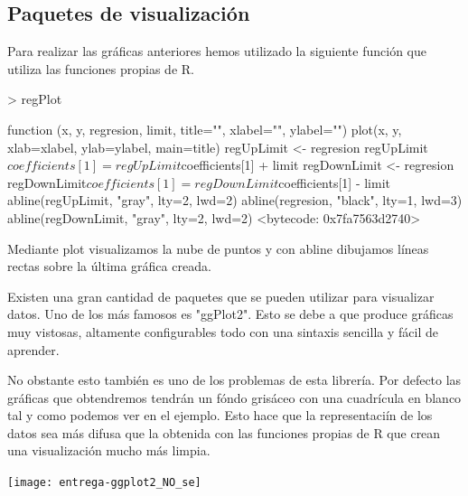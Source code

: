 \documentclass [a4paper] {article}
\begin{document}
\subsection{Paquetes de visualización}
Para realizar las gráficas anteriores hemos utilizado la siguiente función que utiliza las funciones propias de R.
\begin{Schunk}
\begin{Sinput}
> regPlot
\end{Sinput}
\begin{Soutput}
function (x, y, regresion, limit, title="", xlabel="", ylabel="") {
  plot(x, y, xlab=xlabel, ylab=ylabel, main=title)
  regUpLimit <- regresion
  regUpLimit$coefficients[1] = regUpLimit$coefficients[1] + limit
  regDownLimit <- regresion
  regDownLimit$coefficients[1] = regDownLimit$coefficients[1] - limit
  abline(regUpLimit, "gray", lty=2, lwd=2)
  abline(regresion, "black", lty=1, lwd=3)
  abline(regDownLimit, "gray", lty=2, lwd=2)
}
<bytecode: 0x7fa7563d2740>
\end{Soutput}
\end{Schunk}
Mediante plot visualizamos la nube de puntos y con abline dibujamos líneas rectas sobre la última gráfica creada.

Existen una gran cantidad de paquetes que se pueden utilizar para visualizar datos.
Uno de los más famosos es "ggPlot2".
Esto se debe a que produce gráficas muy vistosas, altamente configurables todo con una sintaxis sencilla y fácil de aprender.

No obstante esto también es uno de los problemas de esta librería.
Por defecto las gráficas que obtendremos tendrán un fóndo grisáceo con una cuadrícula en blanco tal y como podemos ver en el ejemplo.
Esto hace que la representaciín de los datos sea más difusa que la obtenida con las funciones propias de R que crean una visualización mucho más limpia.
\begin{center}
\texttt{[image: entrega-ggplot2\_NO\_se]}
\end{center}
\end{document}
